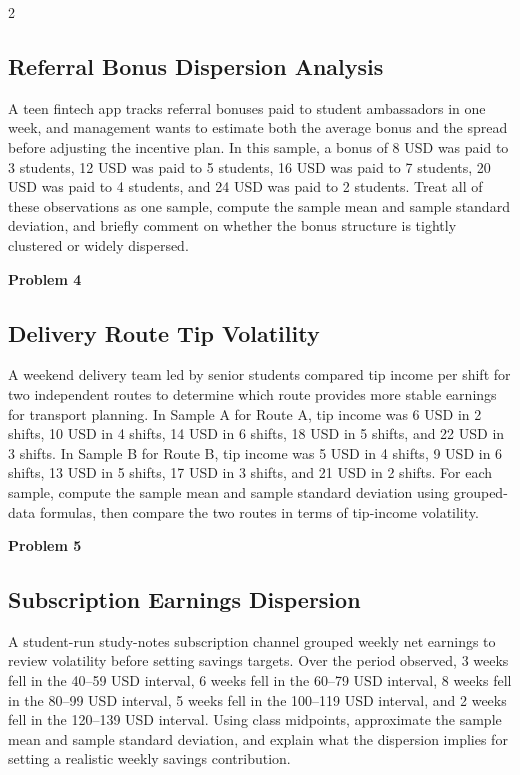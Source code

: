 \documentclass[12pt]{article}
\newcommand{\SubsectionBox}[1]{%
\noindent\colorbox{gray!30}{\parbox{\linewidth}{\textbf{#1}}}\par\vspace{0.35cm}%
}
\begin{document}
\begin{multicols}{2}
\subsection*{Referral Bonus Dispersion Analysis}
A teen fintech app tracks referral bonuses paid to student ambassadors in one week, and management wants to estimate both the average bonus and the spread before adjusting the incentive plan. In this sample, a bonus of 8 USD was paid to 3 students, 12 USD was paid to 5 students, 16 USD was paid to 7 students, 20 USD was paid to 4 students, and 24 USD was paid to 2 students. Treat all of these observations as one sample, compute the sample mean and sample standard deviation, and briefly comment on whether the bonus structure is tightly clustered or widely dispersed.

\vspace{0.5cm}
\SubsectionBox{Problem 4}
\subsection*{Delivery Route Tip Volatility}
A weekend delivery team led by senior students compared tip income per shift for two independent routes to determine which route provides more stable earnings for transport planning. In Sample A for Route A, tip income was 6 USD in 2 shifts, 10 USD in 4 shifts, 14 USD in 6 shifts, 18 USD in 5 shifts, and 22 USD in 3 shifts. In Sample B for Route B, tip income was 5 USD in 4 shifts, 9 USD in 6 shifts, 13 USD in 5 shifts, 17 USD in 3 shifts, and 21 USD in 2 shifts. For each sample, compute the sample mean and sample standard deviation using grouped-data formulas, then compare the two routes in terms of tip-income volatility.

\vspace{0.5cm}
\SubsectionBox{Problem 5}
\subsection*{Subscription Earnings Dispersion}
A student-run study-notes subscription channel grouped weekly net earnings to review volatility before setting savings targets. Over the period observed, 3 weeks fell in the 40--59 USD interval, 6 weeks fell in the 60--79 USD interval, 8 weeks fell in the 80--99 USD interval, 5 weeks fell in the 100--119 USD interval, and 2 weeks fell in the 120--139 USD interval. Using class midpoints, approximate the sample mean and sample standard deviation, and explain what the dispersion implies for setting a realistic weekly savings contribution.


\end{multicols}
\end{document}

